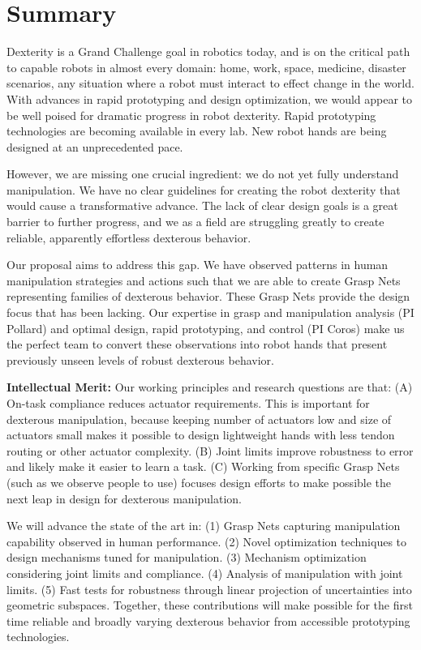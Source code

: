 \section{Summary}

Dexterity is a Grand Challenge goal in robotics today, and is on the critical path to capable robots in almost every domain:  home, work, space, medicine, disaster scenarios, any situation where a robot must interact to effect change in the world.    With advances in rapid prototyping and design optimization, we would appear to be well poised for dramatic progress in robot dexterity.   Rapid prototyping technologies are becoming available in every lab.    New robot hands are being designed at an unprecedented pace.

However, we are missing one crucial ingredient:  we do not yet fully understand manipulation.   We have no clear guidelines for creating the robot dexterity that would cause a transformative advance.   The lack of clear design goals is a great barrier to further progress, and we as a field are struggling greatly to create reliable, apparently effortless dexterous behavior.

Our proposal aims to address this gap.   We have observed patterns in human manipulation strategies and actions such that we are able to create Grasp Nets representing families of dexterous behavior.    These Grasp Nets provide the design focus that has been lacking.    Our expertise in grasp and manipulation analysis (PI Pollard) and optimal design, rapid prototyping, and control (PI Coros) make us the perfect team to convert these observations  into robot hands that present previously unseen levels of robust dexterous behavior.

{\bf Intellectual Merit:}
Our working principles and research questions are that:
(A) On-task compliance reduces actuator requirements.   This is important for dexterous manipulation, because keeping number of actuators low and size of actuators small makes it possible to design lightweight hands with less tendon routing or other actuator complexity.
(B) Joint limits improve robustness to error and likely make it easier to learn a task.
(C) Working from specific Grasp Nets (such as we observe people to use) focuses design efforts to make possible the next leap in design for dexterous manipulation.

We will advance the state of the art in:
(1) Grasp Nets capturing manipulation capability observed in human performance.
(2) Novel optimization techniques to design mechanisms tuned for manipulation.
(3) Mechanism optimization considering joint limits and compliance.
(4) Analysis of manipulation with joint limits.
(5) Fast tests for robustness through linear projection of uncertainties into geometric subspaces.
Together, these contributions will make possible for the first time reliable and broadly varying dexterous behavior from accessible prototyping technologies.

